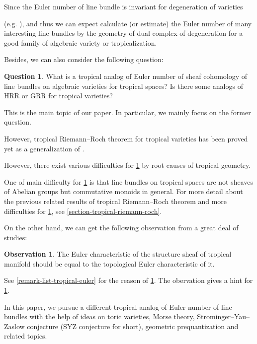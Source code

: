 \documentclass[a4paper,dvipdfmx,reqno,12pt]{amsart}
\theoremstyle{definition}
\newtheorem{question}[theorem]{Question}
\newtheorem{observation}[theorem]{Observation}
\numberwithin{equation}{section}
\begin{document}
Since the Euler number of line bundle is invariant for 
degeneration of varieties

(e.g. \cite[p.50]{MR2514037}), 
and thus we can expect calculate (or estimate)
the Euler number of many interesting line bundles
by the geometry of dual complex of degeneration 
for a good family of algebraic variety or 
tropicalization.

Besides, we can also consider the following question:

\begin{question} \label{question-tropical-euler}
What is a tropical analog of Euler number of sheaf 
cohomology of line bundles on algebraic varieties for 
tropical spaces? Is there some analogs of HRR or GRR 
for tropical varieties?
\end{question}

This is the main topic of our paper.
In particular, we mainly focus on
the former question.


However, tropical Riemann--Roch theorem 
for tropical varieties has been proved yet 
as a generalization of 
\cite{gathmannRiemannRochTheoremTropical2008a}.

However, there exist various difficulties for 
\cref{question-tropical-euler} by root causes of 
tropical geometry.

One of main difficulty for \cref{question-tropical-euler} 
is that line bundles on tropical spaces are not sheaves of 
Abelian groups but commutative monoids in general.
For more detail about the previous related results of 
tropical Riemann--Roch theorem
and more difficulties for 
\cref{question-tropical-euler}, see 
\cref{section-tropical-riemann-roch}.

On the other hand, we can get the following 
observation from a great deal of studies:
\begin{observation} \label{observation-tropical-euler}
The Euler characteristic of the structure sheaf of 
tropical manifold should be equal to 
the topological Euler characteristic of it.
\end{observation}
See \cref{remark-list-tropical-euler} for the reason of 
\cref{observation-tropical-euler}. 
The obervation gives a hint for
\cref{question-tropical-euler}.  







In this paper, we pursue a different tropical
analog of Euler number of line bundles with the help of 
ideas on toric varieties, Morse theory,
Strominger--Yau--Zaslow conjecture
(SYZ conjecture for short), geometric prequantization
and related topics.
\end{document}
